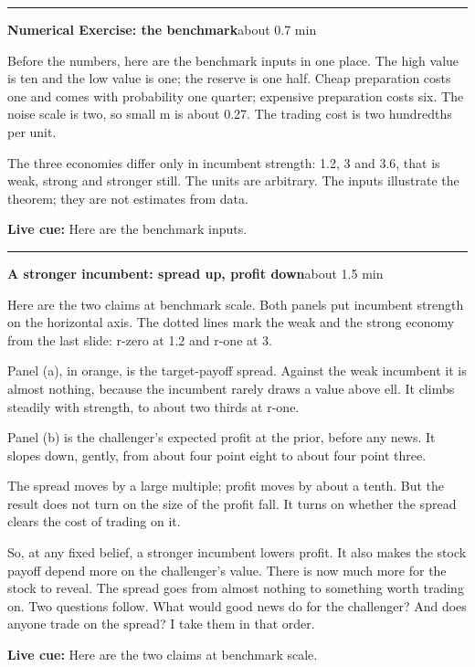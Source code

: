 \documentclass[11pt]{article}
\newcommand{\Cue}[1]{\par\nobreak\smallskip\noindent
  \textcolor{ScriptGray}{\footnotesize\textbf{Live cue:} #1}\par}
\newcommand{\scriptframe}[3]{%
  \Needspace{9\baselineskip}%
  \par\medskip\noindent\textcolor{ScriptBlue}{\rule{\linewidth}{0.55pt}}%
  \par\smallskip\noindent
  \textbf{#1}\hfill\textcolor{ScriptGray}{\small #2}\par\smallskip
  #3\par}
\begin{document}
\scriptframe{Numerical Exercise: the benchmark}{about 0.7 min}{%
  Before the numbers, here are the benchmark inputs in one place. The high
  value is ten and the low value is one; the reserve is one half.
  Cheap preparation costs one and comes with probability one quarter;
  expensive preparation costs six.
  The noise scale is two, so small m is about 0.27. The trading cost is two
  hundredths per unit.

  The three economies differ only in incumbent strength: 1.2, 3 and 3.6, that
  is weak, strong and stronger still.
  The units are arbitrary. The inputs illustrate the theorem; they are not
  estimates from data.
  \Cue{Here are the benchmark inputs.}
}

\scriptframe{A stronger incumbent: spread up, profit down}{about 1.5 min}{%
  Here are the two claims at benchmark scale. Both panels put incumbent
  strength on the horizontal axis. The dotted lines mark the weak and the strong
  economy from the last slide: r-zero at 1.2 and r-one at 3.

  Panel (a), in orange, is the target-payoff spread. Against the weak incumbent
  it is almost nothing, because the incumbent rarely draws a value above ell.
  It climbs steadily with strength, to about two thirds at r-one.

  Panel (b) is the challenger's expected profit at the prior, before any news.
  It slopes down, gently, from about four point eight to about four point three.

  The spread moves by a large multiple; profit moves by about a tenth. But the
  result does not turn on the size of the profit fall. It turns on whether the
  spread clears the cost of trading on it.

  So, at any fixed belief, a stronger incumbent lowers profit. It also makes
  the stock payoff depend more on the challenger's value. There is now much
  more for the stock to reveal. The spread goes from almost nothing to something worth
  trading on. Two questions follow. What would good news do for the
  challenger? And does anyone trade on the spread? I take them in that order.
  \Cue{Here are the two claims at benchmark scale.}
}
\end{document}
